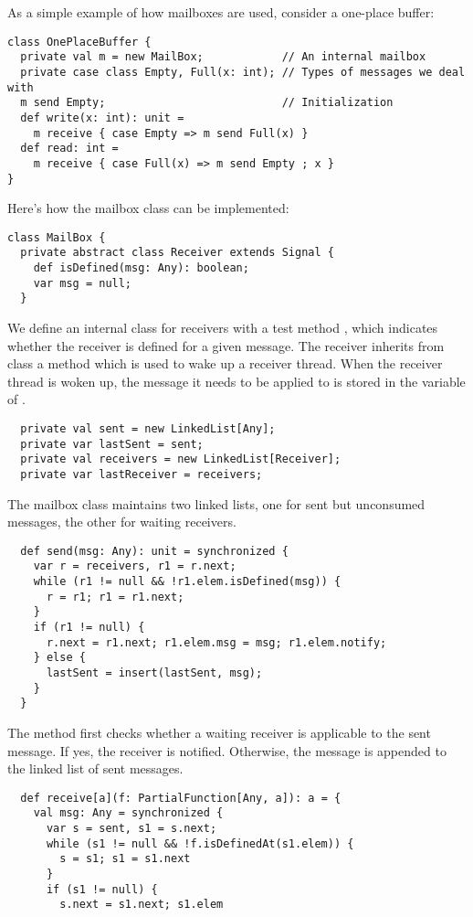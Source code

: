{As a simple example of how mailboxes are used, consider a
one-place buffer:
\begin{lstlisting}
class OnePlaceBuffer {
  private val m = new MailBox;            // An internal mailbox
  private case class Empty, Full(x: int); // Types of messages we deal with
  m send Empty;                           // Initialization
  def write(x: int): unit =
    m receive { case Empty => m send Full(x) }
  def read: int =
    m receive { case Full(x) => m send Empty ; x }
}
\end{lstlisting}
Here's how the mailbox class can be implemented:
\begin{lstlisting}
class MailBox {
  private abstract class Receiver extends Signal {
    def isDefined(msg: Any): boolean;
    var msg = null;
  }
\end{lstlisting}
We define an internal class for receivers with a test method
, which indicates whether the receiver is
defined for a given message.  The receiver inherits from class
 a  method which is used to wake up a
receiver thread. When the receiver thread is woken up, the message it
needs to be applied to is stored in the  variable of
.
\begin{lstlisting}
  private val sent = new LinkedList[Any];
  private var lastSent = sent;
  private val receivers = new LinkedList[Receiver];
  private var lastReceiver = receivers;
\end{lstlisting}
The mailbox class maintains two linked lists,
one for sent but unconsumed messages, the other for waiting receivers.
\begin{lstlisting}
  def send(msg: Any): unit = synchronized {
    var r = receivers, r1 = r.next;
    while (r1 != null && !r1.elem.isDefined(msg)) {
      r = r1; r1 = r1.next;
    }
    if (r1 != null) {
      r.next = r1.next; r1.elem.msg = msg; r1.elem.notify;
    } else {
      lastSent = insert(lastSent, msg);
    }
  }
\end{lstlisting}
The  method first checks whether a waiting receiver is
applicable to the sent message. If yes, the receiver is notified.
Otherwise, the message is appended to the linked list of sent messages.
\begin{lstlisting}
  def receive[a](f: PartialFunction[Any, a]): a = {
    val msg: Any = synchronized {
      var s = sent, s1 = s.next;
      while (s1 != null && !f.isDefinedAt(s1.elem)) {
        s = s1; s1 = s1.next
      }
      if (s1 != null) {
        s.next = s1.next; s1.elem

\end{lstlisting}}
